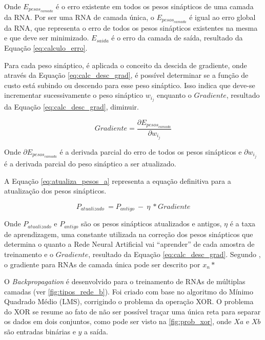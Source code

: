 \documentclass[12pt,oneside,a4paper,chapter=TITLE,section=TITLE,sumario
		=tradicional]{abntex2}
\begin{document}
\begin{lista}
\begin{lista}
				Onde $E_{pesos_{camada}}$ é o erro existente em todos os pesos sinápticos de uma camada da RNA. Por ser uma RNA de camada única, o $E_{pesos_{camada}}$ é igual ao erro global da RNA, que representa o erro de todos os pesos sinápticos existentes na mesma e que deve ser minimizado. $E_{saida}$ é o erro da camada de saída, resultado da Equação \ref{eq:calculo_erro}.
				
				Para cada peso sináptico, é aplicada o conceito da descida de gradiente, onde através da Equação \ref{eq:calc_desc_grad}, é possível determinar se a função de custo está subindo ou descendo para esse peso sináptico. Isso indica que deve-se incrementar sucessivamente o peso sináptico $w_{i_{j}}$ enquanto o $Gradiente$, resultado da Equação \ref{eq:calc_desc_grad}, diminuir.
				
				\begin{equation}
				\label{eq:calc_desc_grad}
				Gradiente = \frac{\partial E_{pesos_{camada}}}{\partial w_{i_{j}}}
				\end{equation}
				
				Onde $\partial E_{pesos_{camada}}$ é a derivada parcial do erro de todos os pesos sinápticos e $\partial w_{i_{j}}$ é a derivada parcial do peso sináptico a ser atualizado.
				
			\end{lista}
			
			A Equação \ref{eq:atualiza_pesos_a} representa a equação definitiva para a atualização dos pesos sinápticos.
				
			\begin{equation}
			\label{eq:atualiza_pesos_a}
			P_{atualizado}\ = P_{antigo}\ -\ \eta\ * Gradiente
			\end{equation}	
			
			Onde $P_{atualizado}$ e $P_{antigo}$ são os pesos sinápticos atualizados e antigos, $\eta$ é a taxa de aprendizagem, uma constante utilizada na correção dos pesos sinápticos que determina o quanto a Rede Neural Artificial vai ``aprender'' de cada amostra de treinamento e o $Gradiente$, resultado da Equação \ref{eq:calc_desc_grad}.
			Segundo , o gradiente para RNAs de camada única pode ser descrito por $x_{n} * $
		\end{lista}			
		
		\label{sec:alg_backprop}
		
		O \textit{Backpropagation} é desenvolvido para o treinamento de RNAs de múltiplas camadas (ver \autoref{fig:tipos_rede_b}). Foi criado com base no algoritmo do Mínimo Quadrado Médio (LMS), corrigindo o problema da operação XOR. O problema do XOR se resume ao fato de não ser possível traçar uma única reta para separar os dados em dois conjuntos, como pode ser visto na \autoref{fig:prob_xor}, onde $Xa$ e $Xb$ são entradas binárias e $y$ a saída.
		
\end{document}
